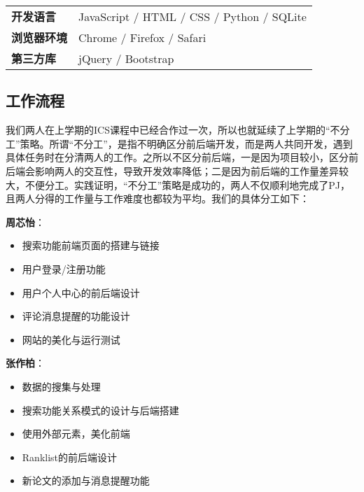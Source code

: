 \begin{table}[h]
\begin{tabular}{ll}
{\bf 开发语言}   & JavaScript / HTML / CSS / Python / SQLite \\
{\bf 浏览器环境} & Chrome / Firefox / Safari \\
{\bf 第三方库}   & jQuery / Bootstrap                             
\end{tabular}
\end{table}

\subsection{工作流程}

我们两人在上学期的ICS课程中已经合作过一次，所以也就延续了上学期的“不分工”策略。所谓“不分工”，是指不明确区分前后端开发，而是两人共同开发，遇到具体任务时在分清两人的工作。之所以不区分前后端，一是因为项目较小，区分前后端会影响两人的交互性，导致开发效率降低；二是因为前后端的工作量差异较大，不便分工。实践证明，“不分工”策略是成功的，两人不仅顺利地完成了PJ，且两人分得的工作量与工作难度也都较为平均。我们的具体分工如下：

\noindent
{\bf 周芯怡}：
\begin{itemize}
\item 搜索功能前端页面的搭建与链接
\item 用户登录/注册功能
\item 用户个人中心的前后端设计
\item 评论消息提醒的功能设计
\item 网站的美化与运行测试
\end{itemize}
{\bf 张作柏}：
\begin{itemize}
\item 数据的搜集与处理
\item 搜索功能关系模式的设计与后端搭建
\item 使用外部元素，美化前端
\item Ranklist的前后端设计
\item 新论文的添加与消息提醒功能
\end{itemize}


